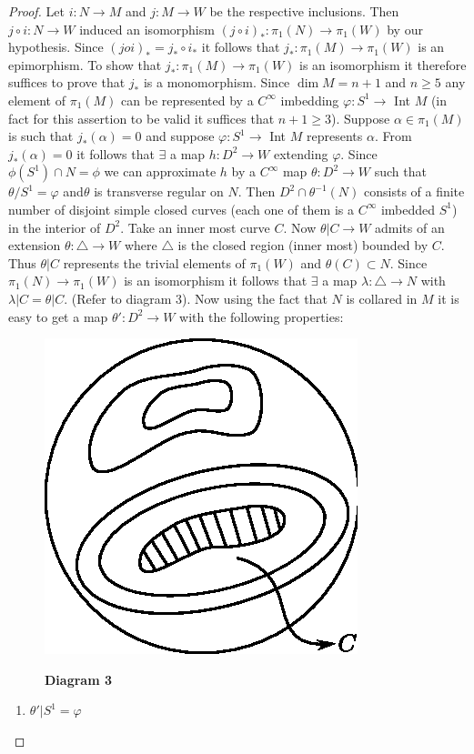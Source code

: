 \begin{proof}
Let $i : N \to M$ and $j : M \to W $ be the respective
inclusions. Then $j \circ i : N \to W$ induced an isomorphism $(j
\circ i)_* :
\pi_1 (N) \to \pi_1 (W)$ by our hypothesis. Since $(joi)_* = j_*  \circ i_*$ it
follows that $j_* : \pi_1 (M)\to \pi_1(W)$ is an epimorphism. To show
that $j_* : \pi_1 (M)\to \pi_1 (W)$ is an isomorphism it therefore
suffices to prove that $j_*$ is a monomorphism. Since $\dim M = n+1$
and $n \geq 5$ any element of $\pi_1 (M)$ can be represented by a
$C^{\infty}$ imbedding $\varphi : S^1 \to$ Int $M$ (in fact for this
assertion to be valid it suffices that $n + 1 \geq 3$). Suppose
$\alpha \in \pi _1 (M)$ is such that $j_* (\alpha ) = 0$ and
suppose $\varphi : S^{1}\to$ Int $M$ represents $\alpha$. From
$j_*(\alpha ) = 0$ it follows that $\exists$ a map $h : D^{2}\to W$
extending $\varphi$. Since $\phi (S^1) \cap N = \phi$ we can
approximate $h$ by a $C^{\infty}$ map $\theta : D^2 \to W$ such that
$\theta / S^1=\varphi$ and\pageoriginale $\theta$ is transverse regular
on $N$. Then 
$D^2 \cap \theta^{-1} (N)$ consists of a finite number of disjoint
simple closed curves (each one of them is a $C^\infty$ imbedded $S^1$)
in the interior of $D^2$. Take an inner most curve $C$. Now $\theta |
C \to W$ admits of an extension $\theta : \bigtriangleup \to W$ where
$\bigtriangleup$ is the closed region (inner most) bounded by
$C$. Thus $\theta | C$ represents the trivial elements of $\pi_1(W)$
and $\theta (C)\subset N$. Since $\pi_1 (N)\to \pi_1 (W)$ is an
isomorphism it follows that $\exists $ a map $\lambda : \bigtriangleup
\to N$ with $\lambda | C = \theta | C$. (Refer to diagram 3). Now
using the fact that $N$ is collared in $M$ it is easy to get a map
$\theta' : D^{2}\to W$ with the following properties: 

\begin{figure}[H]
\centering
\includegraphics{vol46-fig/fig46-2.eps}
\centerline{\bf Diagram 3}
\end{figure}
\begin{enumerate}[(1)]
\item $\theta' | S^1 = \varphi$


\end{enumerate}
\end{proof}

